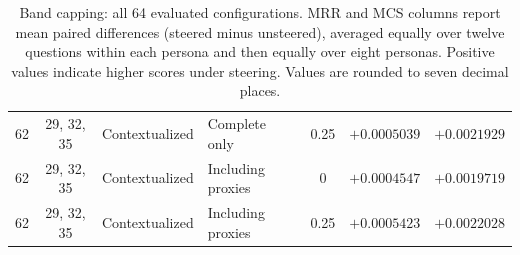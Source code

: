 \begin{table}[p]
\begin{tabular*}{\textwidth}{@{\extracolsep{\fill}}ccllcrr@{}}
62 & 29, 32, 35 & Contextualized & Complete only & 0.25 & $+0.0005039$ & $+0.0021929$ \\
62 & 29, 32, 35 & Contextualized & Including proxies & 0 & $+0.0004547$ & $+0.0019719$ \\
62 & 29, 32, 35 & Contextualized & Including proxies & 0.25 & $+0.0005423$ & $+0.0022028$ \\
\bottomrule
\end{tabular*}
\caption{Band capping: all 64 evaluated configurations. MRR and MCS columns report mean paired differences (steered minus unsteered), averaged equally over twelve questions within each persona and then equally over eight personas. Positive values indicate higher scores under steering. Values are rounded to seven decimal places.}
\label{tab:quantitative-beta-all}
\end{table}
